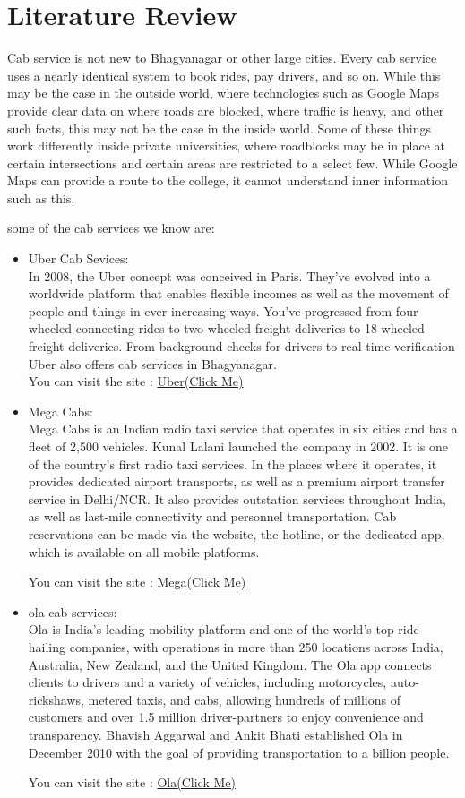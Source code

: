 \documentclass[conference]{IEEEtran}
\begin{document}
\section{Literature Review}
Cab service is not new to Bhagyanagar or other large cities. Every cab service uses a nearly identical system to book rides, pay drivers, and so on. While this may be the case in the outside world, where technologies such as Google Maps provide clear data on where roads are blocked, where traffic is heavy, and other such facts, this may not be the case in the inside world. Some of these things work differently inside private universities, where roadblocks may be in place at certain intersections and certain areas are restricted to a select few. While Google Maps can provide a route to the college, it cannot understand inner information such as this. \par
some of the cab services we know are:\\
\begin{itemize}
\item Uber Cab Sevices:\\
In 2008, the Uber concept was conceived in Paris. They've evolved into a worldwide platform that enables flexible incomes as well as the movement of people and things in ever-increasing ways. You've progressed from four-wheeled connecting rides to two-wheeled freight deliveries to 18-wheeled freight deliveries. From background checks for drivers to real-time verification Uber also offers cab services in Bhagyanagar.\\
You can visit the site : \href{https://www.uber.com/in/en/}{Uber(Click Me)}
\item Mega Cabs:\\
Mega Cabs is an Indian radio taxi service that operates in six cities and has a fleet of 2,500 vehicles. Kunal Lalani launched the company in 2002. It is one of the country's first radio taxi services.
In the places where it operates, it provides dedicated airport transports, as well as a premium airport transfer service in Delhi/NCR.
It also provides outstation services throughout India, as well as last-mile connectivity and personnel transportation. Cab reservations can be made via the website, the hotline, or the dedicated app, which is available on all mobile platforms.\par
You can visit the site : \href{https://www.megacabs.com/}{Mega(Click Me)}
\item ola cab services:\\
Ola is India's leading mobility platform and one of the world's top ride-hailing companies, with operations in more than 250 locations across India, Australia, New Zealand, and the United Kingdom. The Ola app connects clients to drivers and a variety of vehicles, including motorcycles, auto-rickshaws, metered taxis, and cabs, allowing hundreds of millions of customers and over 1.5 million driver-partners to enjoy convenience and transparency. Bhavish Aggarwal and Ankit Bhati established Ola in December 2010 with the goal of providing transportation to a billion people.\par
You can visit the site : \href{https://olacabs.com/}{Ola(Click Me)}
\end{itemize}
\end{document}
